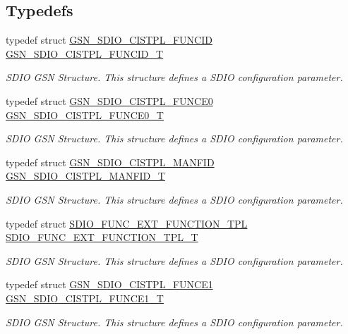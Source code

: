 \subsection*{Typedefs}
\begin{DoxyCompactItemize}
\item 
typedef struct \hyperlink{a00221}{GSN\_\-SDIO\_\-CISTPL\_\-FUNCID} \hyperlink{a00653_ga6ed752facb495193a30f5e53dfa13490}{GSN\_\-SDIO\_\-CISTPL\_\-FUNCID\_\-T}
\begin{DoxyCompactList}\small\item\em SDIO GSN Structure. This structure defines a SDIO configuration parameter. \end{DoxyCompactList}\item 
typedef struct \hyperlink{a00219}{GSN\_\-SDIO\_\-CISTPL\_\-FUNCE0} \hyperlink{a00653_ga9437621f0901955674de851edfc146b0}{GSN\_\-SDIO\_\-CISTPL\_\-FUNCE0\_\-T}
\begin{DoxyCompactList}\small\item\em SDIO GSN Structure. This structure defines a SDIO configuration parameter. \end{DoxyCompactList}\item 
typedef struct \hyperlink{a00222}{GSN\_\-SDIO\_\-CISTPL\_\-MANFID} \hyperlink{a00653_gab74bdd813aab97891c103a24000c5131}{GSN\_\-SDIO\_\-CISTPL\_\-MANFID\_\-T}
\begin{DoxyCompactList}\small\item\em SDIO GSN Structure. This structure defines a SDIO configuration parameter. \end{DoxyCompactList}\item 
typedef struct \hyperlink{a00458}{SDIO\_\-FUNC\_\-EXT\_\-FUNCTION\_\-TPL} \hyperlink{a00653_ga3df33f78e69366f3c3feccb1b2ca27c4}{SDIO\_\-FUNC\_\-EXT\_\-FUNCTION\_\-TPL\_\-T}
\begin{DoxyCompactList}\small\item\em SDIO GSN Structure. This structure defines a SDIO configuration parameter. \end{DoxyCompactList}\item 
typedef struct \hyperlink{a00220}{GSN\_\-SDIO\_\-CISTPL\_\-FUNCE1} \hyperlink{a00653_gaad08d4da003d74eb8301281f67bdde39}{GSN\_\-SDIO\_\-CISTPL\_\-FUNCE1\_\-T}
\begin{DoxyCompactList}\small\item\em SDIO GSN Structure. This structure defines a SDIO configuration parameter. \end{DoxyCompactList}\item 

\end{DoxyCompactItemize}
